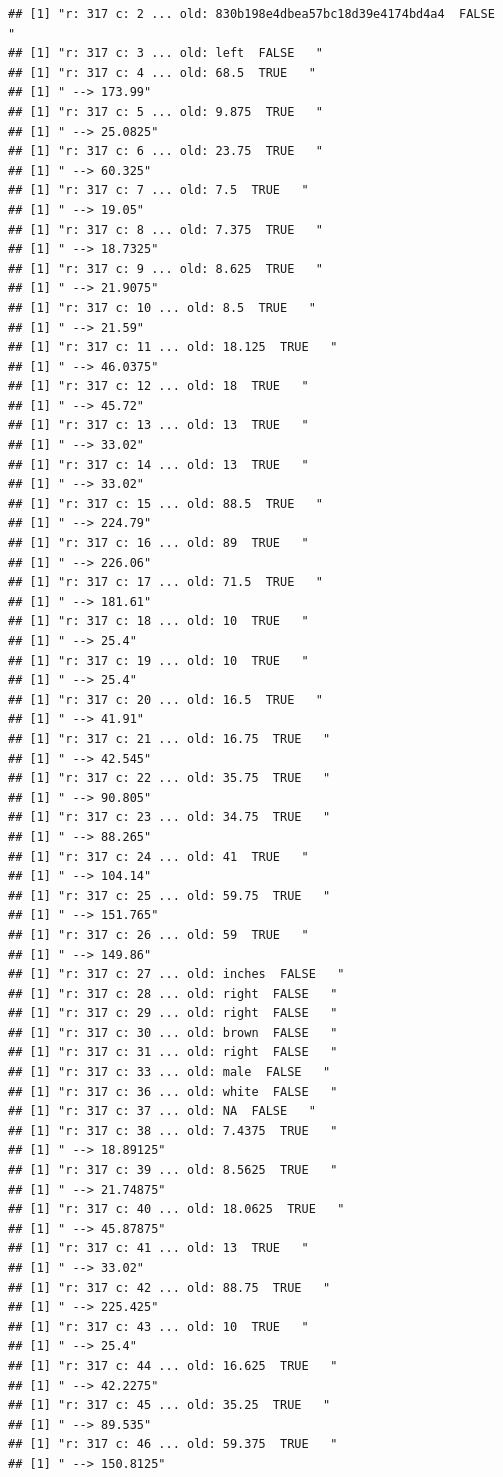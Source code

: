 \documentclass[]{article}
\begin{document}
\begin{verbatim}
## [1] "r: 317 c: 2 ... old: 830b198e4dbea57bc18d39e4174bd4a4  FALSE   "
## [1] "r: 317 c: 3 ... old: left  FALSE   "
## [1] "r: 317 c: 4 ... old: 68.5  TRUE   "
## [1] " --> 173.99"
## [1] "r: 317 c: 5 ... old: 9.875  TRUE   "
## [1] " --> 25.0825"
## [1] "r: 317 c: 6 ... old: 23.75  TRUE   "
## [1] " --> 60.325"
## [1] "r: 317 c: 7 ... old: 7.5  TRUE   "
## [1] " --> 19.05"
## [1] "r: 317 c: 8 ... old: 7.375  TRUE   "
## [1] " --> 18.7325"
## [1] "r: 317 c: 9 ... old: 8.625  TRUE   "
## [1] " --> 21.9075"
## [1] "r: 317 c: 10 ... old: 8.5  TRUE   "
## [1] " --> 21.59"
## [1] "r: 317 c: 11 ... old: 18.125  TRUE   "
## [1] " --> 46.0375"
## [1] "r: 317 c: 12 ... old: 18  TRUE   "
## [1] " --> 45.72"
## [1] "r: 317 c: 13 ... old: 13  TRUE   "
## [1] " --> 33.02"
## [1] "r: 317 c: 14 ... old: 13  TRUE   "
## [1] " --> 33.02"
## [1] "r: 317 c: 15 ... old: 88.5  TRUE   "
## [1] " --> 224.79"
## [1] "r: 317 c: 16 ... old: 89  TRUE   "
## [1] " --> 226.06"
## [1] "r: 317 c: 17 ... old: 71.5  TRUE   "
## [1] " --> 181.61"
## [1] "r: 317 c: 18 ... old: 10  TRUE   "
## [1] " --> 25.4"
## [1] "r: 317 c: 19 ... old: 10  TRUE   "
## [1] " --> 25.4"
## [1] "r: 317 c: 20 ... old: 16.5  TRUE   "
## [1] " --> 41.91"
## [1] "r: 317 c: 21 ... old: 16.75  TRUE   "
## [1] " --> 42.545"
## [1] "r: 317 c: 22 ... old: 35.75  TRUE   "
## [1] " --> 90.805"
## [1] "r: 317 c: 23 ... old: 34.75  TRUE   "
## [1] " --> 88.265"
## [1] "r: 317 c: 24 ... old: 41  TRUE   "
## [1] " --> 104.14"
## [1] "r: 317 c: 25 ... old: 59.75  TRUE   "
## [1] " --> 151.765"
## [1] "r: 317 c: 26 ... old: 59  TRUE   "
## [1] " --> 149.86"
## [1] "r: 317 c: 27 ... old: inches  FALSE   "
## [1] "r: 317 c: 28 ... old: right  FALSE   "
## [1] "r: 317 c: 29 ... old: right  FALSE   "
## [1] "r: 317 c: 30 ... old: brown  FALSE   "
## [1] "r: 317 c: 31 ... old: right  FALSE   "
## [1] "r: 317 c: 33 ... old: male  FALSE   "
## [1] "r: 317 c: 36 ... old: white  FALSE   "
## [1] "r: 317 c: 37 ... old: NA  FALSE   "
## [1] "r: 317 c: 38 ... old: 7.4375  TRUE   "
## [1] " --> 18.89125"
## [1] "r: 317 c: 39 ... old: 8.5625  TRUE   "
## [1] " --> 21.74875"
## [1] "r: 317 c: 40 ... old: 18.0625  TRUE   "
## [1] " --> 45.87875"
## [1] "r: 317 c: 41 ... old: 13  TRUE   "
## [1] " --> 33.02"
## [1] "r: 317 c: 42 ... old: 88.75  TRUE   "
## [1] " --> 225.425"
## [1] "r: 317 c: 43 ... old: 10  TRUE   "
## [1] " --> 25.4"
## [1] "r: 317 c: 44 ... old: 16.625  TRUE   "
## [1] " --> 42.2275"
## [1] "r: 317 c: 45 ... old: 35.25  TRUE   "
## [1] " --> 89.535"
## [1] "r: 317 c: 46 ... old: 59.375  TRUE   "
## [1] " --> 150.8125"

\end{verbatim}
\end{document}
